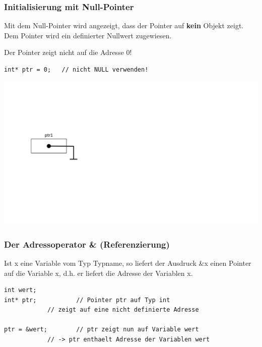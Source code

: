 \subsubsection{Initialisierung mit Null-Pointer}
Mit dem Null-Pointer wird angezeigt, dass der Pointer auf \textbf{kein} Objekt zeigt. Dem Pointer wird ein definierter Nullwert zugewiesen.\\
\begin{hinweis}
Der Pointer zeigt nicht auf die Adresse 0!
\end{hinweis}
\noindent
\begin{minipage}{0.5\linewidth}
\begin{lstlisting}
int* ptr = 0;	// nicht NULL verwenden!
\end{lstlisting}
\end{minipage}
\hspace{0.01\linewidth}
\begin{minipage}{0.2\linewidth}
	\includegraphics[width=\linewidth]{images/pointer3.pdf}
\end{minipage}

\subsubsection{Der Adressoperator \& \textbf{(Referenzierung)}}
Ist x eine Variable vom Typ Typname, so liefert der Ausdruck \&x einen Pointer auf die Variable x, d.h. er liefert die Adresse der Variablen x.\\
\noindent
\begin{minipage}{0.65\linewidth}
\begin{lstlisting}
int wert;
int* ptr;			// Pointer ptr auf Typ int
			// zeigt auf eine nicht definierte Adresse
		
ptr = &wert;		// ptr zeigt nun auf Variable wert 
			// -> ptr enthaelt Adresse der Variablen wert
\end{lstlisting}
\end{minipage}

